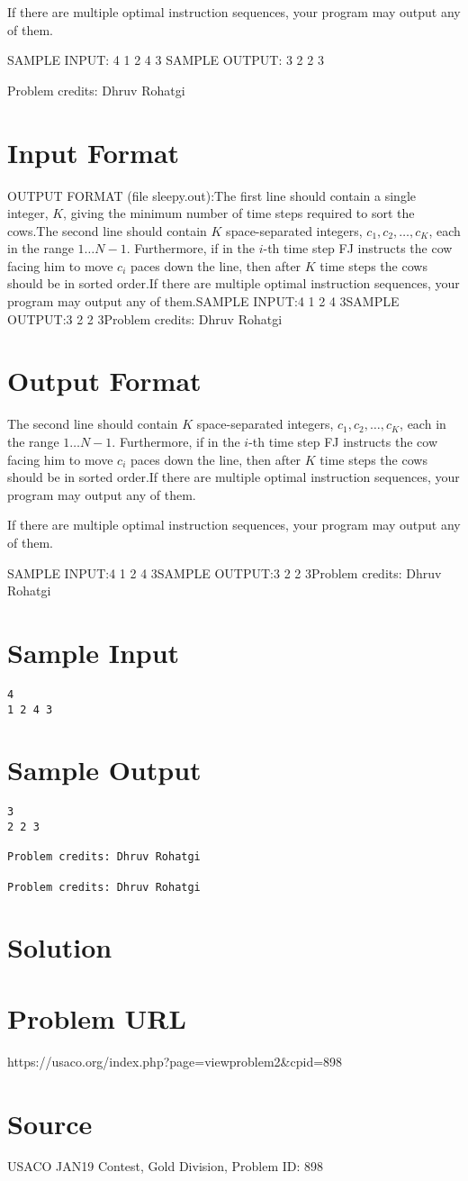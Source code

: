 \documentclass[12pt]{article}
\begin{document}
If there are multiple optimal instruction sequences, your program may output any
of them.

SAMPLE INPUT:
4
1 2 4 3
SAMPLE OUTPUT: 
3
2 2 3


Problem credits: Dhruv Rohatgi



\section*{Input Format}
OUTPUT FORMAT (file sleepy.out):The first line should contain a single integer, $K$, giving the minimum number of time
steps required to sort the cows.The second line should contain $K$ space-separated integers,
$c_1, c_2, \dots, c_K$, each in the range $1 \ldots N-1$.  
Furthermore, if in the $i$-th time step FJ
instructs the cow facing him to move $c_i$ paces down the line, then after $K$
time steps the cows should be in sorted order.If there are multiple optimal instruction sequences, your program may output any
of them.SAMPLE INPUT:4
1 2 4 3SAMPLE OUTPUT:3
2 2 3Problem credits: Dhruv Rohatgi

\section*{Output Format}
The second line should contain $K$ space-separated integers,
$c_1, c_2, \dots, c_K$, each in the range $1 \ldots N-1$.  
Furthermore, if in the $i$-th time step FJ
instructs the cow facing him to move $c_i$ paces down the line, then after $K$
time steps the cows should be in sorted order.If there are multiple optimal instruction sequences, your program may output any
of them.

If there are multiple optimal instruction sequences, your program may output any
of them.

SAMPLE INPUT:4
1 2 4 3SAMPLE OUTPUT:3
2 2 3Problem credits: Dhruv Rohatgi

\section*{Sample Input}
\begin{verbatim}
4
1 2 4 3
\end{verbatim}

\section*{Sample Output}
\begin{verbatim}
3
2 2 3

Problem credits: Dhruv Rohatgi

Problem credits: Dhruv Rohatgi
\end{verbatim}

\section*{Solution}


\section*{Problem URL}
https://usaco.org/index.php?page=viewproblem2&cpid=898

\section*{Source}
USACO JAN19 Contest, Gold Division, Problem ID: 898
\end{document}
